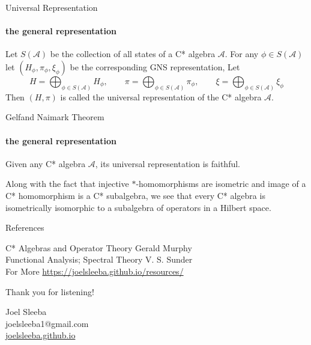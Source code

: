\documentclass[dvipsnames]{beamer}
\newcommand{\1}{\mathds{1}}	%
\begin{document}
\begin{frame}{Universal Representation}
  \framesubtitle{the general representation}
  \begin{definition}
    Let $S(\mathcal{A})$ be the collection of all states of a C* algebra $\mathcal{A}$. \pause For any $\phi \in S(\mathcal{A})$ let $(H_\phi, \pi_\phi, \xi_\phi)$ be the corresponding GNS representation, Let $$H = \bigoplus_{\phi \in S(\mathcal{A})} H_\phi, \quad\quad \pi = \bigoplus_{\phi \in S(\mathcal{A})} \pi_\phi, \quad \quad \xi = \bigoplus_{\phi \in S(\mathcal{A})} \xi_\phi$$
    Then $(H, \pi)$ is called the universal representation of the C* algebra $\mathcal{A}$.
  \end{definition}
\end{frame}

\begin{frame}{Gelfand Naimark Theorem}
  \framesubtitle{the general representation}
  \begin{theorem}
    Given any C* algebra $\mathcal{A}$, its universal representation is faithful.
  \end{theorem}
  \pause
  \vspace{1em}
  Along with the fact that injective $*$-homomorphisms are isometric and image of a C* homomorphism is a C* subalgebra, we see that every C* algebra is isometrically isomorphic to a subalgebra of operators in a Hilbert space.
\end{frame}

\begin{frame}{References}
\begin{thebibliography}{10}
\beamertemplatearticlebibitems
{\small

C* Algebras and Operator Theory
\newblock Gerald Murphy \\

Functional Analysis; Spectral Theory
\newblock V. S. Sunder\\

  For More
\newblock \url{https://joelsleeba.github.io/resources/}
}
\end{thebibliography}
\end{frame}


\begin{frame}
\begin{center}
{\large\color{titleText} Thank you for listening!}
\vspace{1cm}

Joel Sleeba \\[1em]
joelsleeba1@gmail.com \\
  \href{https://joelsleeba.github.io}{joelsleeba.github.io}
\end{center}
\end{frame}

\end{document}
